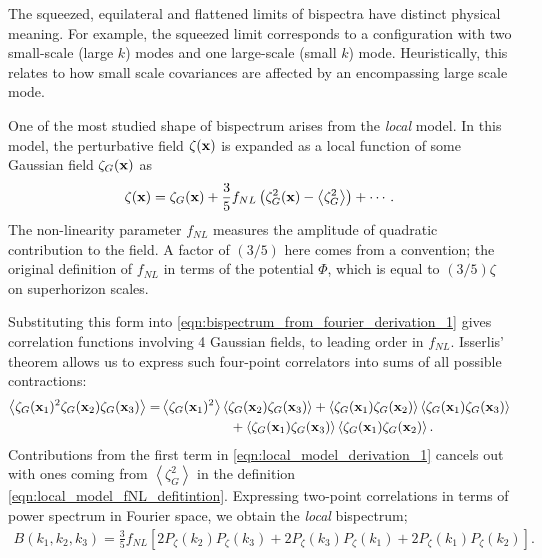 The squeezed, equilateral and flattened limits of bispectra have distinct physical meaning. For example, the squeezed limit corresponds to a configuration with two small-scale (large $k$) modes and one large-scale (small $k$) mode. Heuristically, this relates to how small scale covariances are affected by an encompassing large scale mode.

One of the most studied shape of bispectrum arises from the \textit{local} model. In this model, the perturbative field $\zeta(\mathbf{x})$ is expanded as a local function of some Gaussian field $\zeta_G(\mathbf{x})$ as
\begin{align}
	\zeta(\mathbf{x}) = \zeta_G(\mathbf{x}) + \frac{3}{5} f_{NL} \left(\zeta_G^2(\mathbf{x}) - \left< \zeta_G^2 \right> \right) + \cdots. \label{eqn:local_model_fNL_defitintion}
\end{align}
The non-linearity parameter $f_{NL}$ measures the amplitude of quadratic contribution to the field. A factor of $(3/5)$ here comes from a convention; the original definition of $f_{NL}$ in terms of the potential $\Phi$, which is equal to $(3/5)\zeta$ on superhorizon scales.

Substituting this form into \eqref{eqn:bispectrum_from_fourier_derivation_1} gives correlation functions involving 4 Gaussian fields, to leading order in $f_{NL}$. Isserlis' theorem allows us to express such four-point correlators into sums of all possible contractions:
\begin{align}
	\left< \zeta_G(\vv{x}_1)^2 \zeta_G(\vv{x}_2) \zeta_G(\vv{x}_3) \right> = &\left< \zeta_G(\vv{x}_1)^2 \right> \left< \zeta_G(\vv{x}_2) \zeta_G(\vv{x}_3) \right> + \left< \zeta_G(\vv{x}_1) \zeta_G(\vv{x}_2) \right> \left< \zeta_G(\vv{x}_1) \zeta_G(\vv{x}_3) \right> \nonumber \\ &\hspace{0.15\textwidth} + \left< \zeta_G(\vv{x}_1) \zeta_G(\vv{x}_3) \right> \left< \zeta_G(\vv{x}_1) \zeta_G(\vv{x}_2) \right>. \label{eqn:local_model_derivation_1}
\end{align}
Contributions from the first term in \eqref{eqn:local_model_derivation_1} cancels out with ones coming from $\left< \zeta_G^2 \right>$ in the definition \eqref{eqn:local_model_fNL_defitintion}. Expressing two-point correlations in terms of power spectrum in Fourier space, we obtain the \textit{local} bispectrum;
\begin{align}
	B(k_1, k_2, k_3) = \frac{3}{5} f_{NL} \left[ 2P_\zeta(k_2) P_\zeta(k_3) + 2P_\zeta(k_3) P_\zeta(k_1) + 2P_\zeta(k_1) P_\zeta(k_2) \right]. \label{eqn:local_bispectrum_using_power_spectrum}
\end{align}

